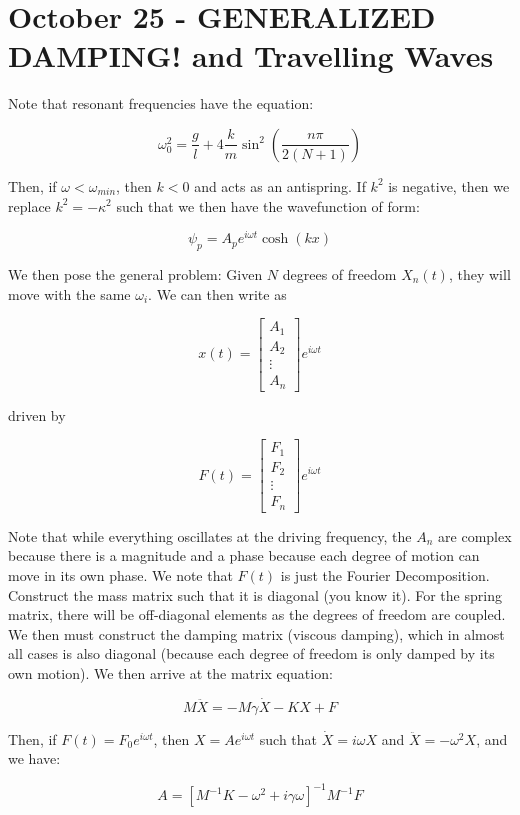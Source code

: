 \documentclass{report}
\begin{document}
\chapter{October 25 - GENERALIZED DAMPING! and Travelling Waves}

Note that resonant frequencies have the equation:

$$\omega_0^2 = \frac{g}{l} + 4 \frac{k}{m}\sin^2\left(\frac{n\pi}{2(N+1)}\right)$$

Then, if $\omega < \omega_{min}$, then $k < 0$ and acts as an antispring. If $k^2$ is negative, then we replace $k^2 = -\kappa^2$ such that we then have the wavefunction of form:

$$\psi_p = A_pe^{i\omega t}\cosh(kx)$$

We then pose the general problem: Given $N$ degrees of freedom $X_n(t)$, they will move with the same $\omega_i$. We can then write as 

$$x(t) = \begin{bmatrix}A_1\\A_2\\\vdots\\A_n\end{bmatrix}e^{i\omega t}$$

driven by

$$F(t) = \begin{bmatrix}F_1\\F_2\\\vdots\\F_n\end{bmatrix}e^{i\omega t}$$

Note that while everything oscillates at the driving frequency, the $A_n$ are complex because there is a magnitude and a phase because each degree  of motion can move in its own phase. We note that $F(t)$ is just the Fourier Decomposition. Construct the mass matrix such that it is diagonal (you know it). For the spring matrix, there will be off-diagonal elements as the degrees of freedom are coupled. We then must construct the damping matrix (viscous damping), which in almost all cases is also diagonal (because each degree of freedom is only damped by its own motion). We then arrive at the matrix equation:

$$M\ddot{X} = -M\gamma\dot{X} - KX + F$$

Then, if $F(t) = F_0 e^{i\omega t}$, then $X = Ae^{i\omega t}$ such that $\dot{X}= i\omega X$ and $\ddot{X} = -\omega^2X$, and we have:

$$A = [M^{-1}K - \omega^2 + i\gamma\omega]^{-1}M^{-1}F$$
\end{document}
